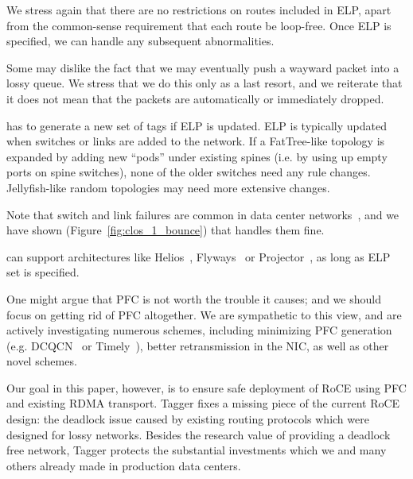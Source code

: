 We stress again that there are no restrictions on routes included in ELP, apart
from the common-sense requirement that each route be loop-free. Once ELP is
specified, we can handle any subsequent abnormalities.

 Some may dislike the fact that we may eventually push
a wayward packet into a lossy queue. We stress that we do this only as a last
resort, and we reiterate that it does not mean that the packets are
automatically or immediately dropped.

 \sysname{} has to generate a new set of tags if ELP is
updated.  ELP is typically updated when switches or links are added to the
network. If a FatTree-like topology is expanded by adding new ``pods'' under
existing spines (i.e. by using up empty ports on spine switches), none of the
older switches need any rule changes.  Jellyfish-like random topologies may need
more extensive changes.

Note that switch and link failures are common in data center
networks~\cite{netpilot}, and we have shown
(Figure~\ref{fig:clos_1_bounce}) that \sysname{} handles them fine. 

 \sysname{} can support architectures
like Helios~\cite{helios}, Flyways~\cite{flyways} or Projector~\cite{projector},
as long as ELP set is specified.

 One might argue that PFC is not worth the trouble it
causes; and we should focus on getting rid of PFC altogether.  We are
sympathetic to this view, and are actively investigating numerous schemes,
including minimizing PFC generation (e.g. DCQCN~\cite{dcqcn} or
Timely~\cite{timely}), better retransmission in the NIC, as well as other
novel schemes.  

Our goal in this paper, however, is to ensure safe deployment of RoCE using PFC and existing RDMA transport. Tagger fixes a missing piece of the current RoCE design: the deadlock issue caused by existing routing protocols which were designed for lossy networks. Besides the research value of providing a deadlock free network, Tagger protects the substantial investments which we and many others already made in production data centers.




